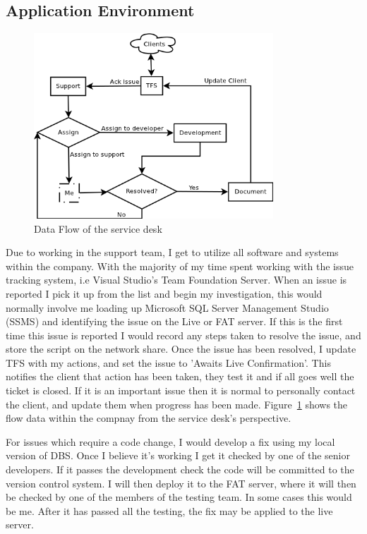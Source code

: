 \documentclass[paper=a4, fontsize=11pt]{scrartcl}	%
\begin{document}
\subsection{Application Environment}
\begin{figure}[htb]
\centering
\includegraphics[width=0.8\textwidth]{DataFlow}
\caption{Data Flow of the service desk}
\label{fig:data_flow}
\end{figure}
Due to working in the support team, I get to utilize all software and systems within the company.
With the majority of my time spent working with the issue tracking system, i.e Visual Studio's Team Foundation Server. When an issue is reported I pick it up from the list and begin my investigation, this would normally involve me loading up Microsoft SQL Server Management Studio\cite{SSMS} (SSMS) and identifying the issue on the Live or FAT server. If this is the first time this issue is reported I would record any steps taken to resolve the issue, and store the script on the network share. Once the issue has been resolved, I update TFS with my actions, and set the issue to 'Awaits Live Confirmation'. This notifies the client that action has been taken, they test it and if all goes well the ticket is closed.
If it is an important issue then it is normal to personally contact the client, and update them when progress has been made. Figure~\ref{fig:data_flow} shows the flow data within the compnay from the service desk's perspective.

For issues which require a code change, I would develop a fix using my local version of DBS. Once I believe it's working I get it checked by one of the senior developers. If it passes the development check the code will be committed to the version control system. I will then deploy it to the FAT server, where it will then be checked by one of the members of the testing team. In some cases this would be me. After it has passed all the testing, the fix may be applied to the live server.
\end{document}
